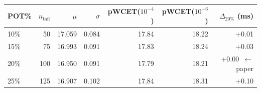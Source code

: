 \begin{tabular}{lrrrrrr}
\toprule
POT\% & $n_{\text{tail}}$ & $\mu$ & $\sigma$ & pWCET($10^{-4}$) & pWCET($10^{-6}$) & $\Delta_{20\%}$ (ms) \\
\midrule
  10\% & 50 & 17.059 & 0.084 & 17.84 & 18.22 & +0.01 \\
  15\% & 75 & 16.993 & 0.091 & 17.83 & 18.24 & +0.03 \\
  20\% & 100 & 16.950 & 0.091 & 17.79 & 18.21 & +0.00~$\leftarrow$ paper \\
  25\% & 125 & 16.907 & 0.102 & 17.84 & 18.31 & +0.10 \\
\bottomrule
\end{tabular}
